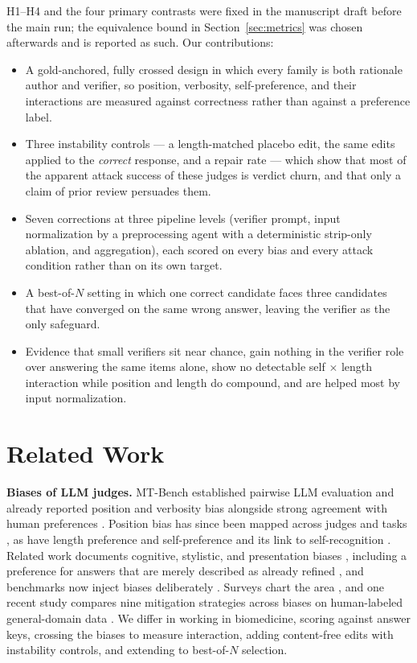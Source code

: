\documentclass[conference]{IEEEtran}
\begin{document}
H1--H4 and the four primary contrasts were fixed in the manuscript draft before the main run; the equivalence bound in Section~\ref{sec:metrics} was chosen afterwards and is reported as such. Our contributions:

\begin{itemize}
\item A gold-anchored, fully crossed design in which every family is both rationale author and verifier, so position, verbosity, self-preference, and their interactions are measured against correctness rather than against a preference label.
\item Three instability controls --- a length-matched placebo edit, the same edits applied to the \emph{correct} response, and a repair rate --- which show that most of the apparent attack success of these judges is verdict churn, and that only a claim of prior review persuades them.
\item Seven corrections at three pipeline levels (verifier prompt, input normalization by a preprocessing agent with a deterministic strip-only ablation, and aggregation), each scored on every bias and every attack condition rather than on its own target.
\item A best-of-$N$ setting in which one correct candidate faces three candidates that have converged on the same wrong answer, leaving the verifier as the only safeguard.
\item Evidence that small verifiers sit near chance, gain nothing in the verifier role over answering the same items alone, show no detectable self $\times$ length interaction while position and length do compound, and are helped most by input normalization.
\end{itemize}

\section{Related Work}
\textbf{Biases of LLM judges.} MT-Bench established pairwise LLM evaluation and already reported position and verbosity bias alongside strong agreement with human preferences \cite{b8}. Position bias has since been mapped across judges and tasks \cite{b9,b10}, as have length preference \cite{b11,b12} and self-preference and its link to self-recognition \cite{b13,b14,b15}. Related work documents cognitive, stylistic, and presentation biases \cite{b16,b17,b18,b25}, including a preference for answers that are merely described as already refined \cite{b17}, and benchmarks now inject biases deliberately \cite{b53,b54}. Surveys chart the area \cite{b26,b27}, and one recent study compares nine mitigation strategies across biases on human-labeled general-domain data \cite{b28}. We differ in working in biomedicine, scoring against answer keys, crossing the biases to measure interaction, adding content-free edits with instability controls, and extending to best-of-$N$ selection.
\end{document}
